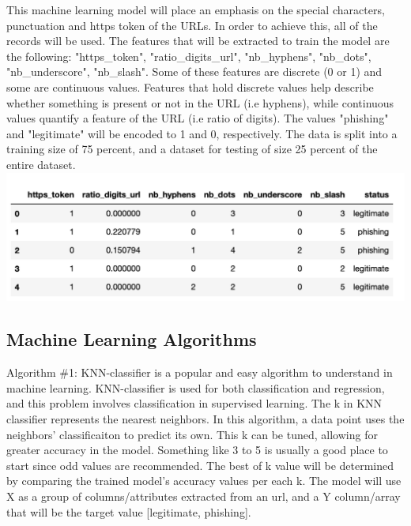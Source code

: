\documentclass[conference]{IEEEtran}
\begin{document}
This machine learning model will place an emphasis on the special characters, punctuation and https token of the URLs. In order to achieve this, all of the records will be used. The features that will be extracted to train the model are the following: "https_token", "ratio_digits_url", "nb_hyphens", "nb_dots", "nb_underscore", "nb_slash". Some of these features are discrete (0 or 1) and some are continuous values. Features that hold discrete values help describe whether something is present or not in the URL (i.e hyphens), while continuous values quantify a feature of the URL (i.e ratio of digits). The values "phishing" and "legitimate" will be encoded to 1 and 0, respectively. The data is split into a training size of 75 percent, and a dataset for testing of size 25 percent of the entire dataset.  
\includegraphics{dataset.png}

\subsection{Machine Learning Algorithms}
Algorithm \#1: KNN-classifier is a popular and easy algorithm to understand in machine learning. KNN-classifier is used for both classification and regression, and this problem involves classification in supervised learning. The k in KNN classifier represents the nearest neighbors. In this algorithm, a data point uses the neighbors' classificaiton to predict its own. This k can be tuned, allowing for greater accuracy in the model. Something like 3 to 5 is usually a good place to start since odd values are recommended. The best of k value will be determined by comparing the trained model's accuracy values per each k. The model will use X as a group of columns/attributes extracted from an url, and a Y column/array that will be the target value [legitimate, phishing].
\end{document}
